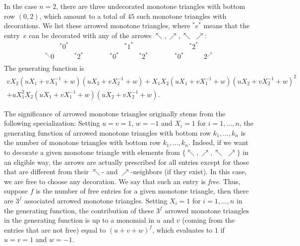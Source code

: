 \documentclass[12pt]{amsart}
\theoremstyle{definition}
\numberwithin{equation}{section}
\newcommand{\nenwarrow}{\nwarrow \!\!\!\!\!\;\!\! \nearrow}
\begin{document}
In the case $n=2$, there are three undecorated monotone triangles with bottom row $(0,2)$, which amount to a total of $45$ such monotone triangles with decorations. We list these arrowed monotone triangles, where $^{*} e^{*}$ means that the entry~$e$ can be decorated with any of the arrows $\nwarrow, \nearrow, \nenwarrow$: \begin{equation*}
	\begin{array}{ccc}
		&   ^{*}0^{*}   & \\
		^{\nwarrow}0 &   & ^{*}2^{*} \\
	\end{array}\qquad\quad\begin{array}{ccc}
	&   ^{*}1^{*}   & \\
	^{*}0^{*} &   & ^{*}2^{*} \\
	\end{array}\qquad\quad\begin{array}{ccc}
	&   ^{*}2^{*}   & \\
	^{*}0^{*} &   & 2^{\nearrow} \\
	\end{array}
\end{equation*}
The generating function is 
\begin{multline} 
\label{case2}
v X_2 (u X_1 + v X_1^{-1} + w) (u X_2 + v X_2^{-1} + w) + X_1 X_2 (u X_1 + v X_1^{-1} + w) (u X_2 + v X_2^{-1} + w) ^2 \\ + u X_1^2  X_2 (u X_1 + v X_1^{-1} + w) (u X_2 + v X_2^{-1} + w).
\end{multline} 

The significance of arrowed monotone triangles originally stems from the following specialization: Setting $u=v=1$, $w=-1$ and $X_i=1$ for $i=1,\ldots,n$, the generating function of arrowed monotone triangles with bottom row $k_1,\ldots,k_n$ is the number of monotone triangles with bottom row $k_1,\ldots,k_n$. Indeed, if we want to decorate a given monotone triangle with elements from 
$\{\nwarrow, \nearrow, \nenwarrow \}$ in an eligible way, the arrows are actually prescribed for all entries except for those that 
are different from their $\nwarrow$- and $\nearrow$-neighbors (if they exist). In this case, we are free to choose any decoration. We say that such an entry is \emph{free}. Thus, suppose $f$ is the number of free entries 
for a given monotone triangle, then there are $3^f$ associated arrowed monotone triangles. Setting $X_i=1$ for $i=1,\ldots,n$ in the generating function, the contribution of these $3^f$ arrowed monotone triangles in the generating function is up to a monomial in $u$ and $v$ (coming from the entries that are not free) equal to 
$(u+v+w)^f$, which evaluates to $1$ if $u=v=1$ and $w=-1$. 
\end{document}

